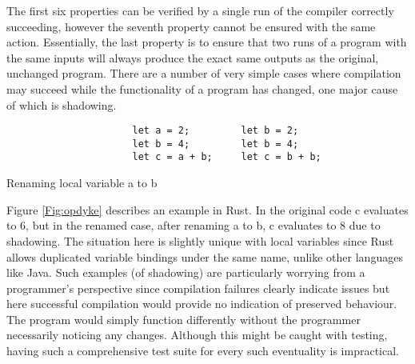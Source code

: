 The first six properties can be verified by a single run of the compiler correctly succeeding, however the seventh property cannot be ensured with the same action. Essentially, the last property is to ensure that two runs of a program with the same inputs will always produce the exact same outputs as the original, unchanged program. There are a number of very simple cases where compilation may succeed while the functionality of a program has changed, one major cause of which is shadowing. 

\begin{fig}
\begin{verbatim}
                      let a = 2;         let b = 2;
                      let b = 4;         let b = 4;
                      let c = a + b;     let c = b + b;
\end{verbatim}
\caption{Renaming local variable a to b}
\label{Fig:opdyke}
\end{fig}

\label{fig:listings}

Figure \ref{Fig:opdyke} describes an example in Rust. In the original code c evaluates to 6, but in the renamed case, after renaming a to b, c evaluates to 8 due to shadowing. The situation here is slightly unique with local variables since Rust allows duplicated variable bindings under the same name, unlike other languages like Java. Such examples (of shadowing) are particularly worrying from a programmer's perspective since compilation failures clearly indicate issues but here successful compilation would provide no indication of preserved behaviour. The program would simply function differently without the programmer necessarily noticing any changes. Although this might be caught with testing, having such a comprehensive test suite for every such eventuality is impractical.

